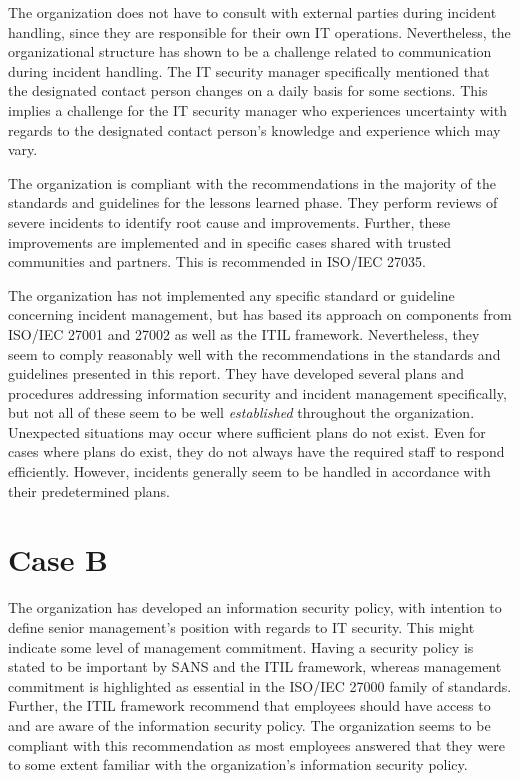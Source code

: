 The organization does not have to consult with external parties during incident handling, since they are responsible for their own IT operations. Nevertheless, the organizational structure has shown to be a challenge related to communication during incident handling. The IT security manager specifically mentioned that the designated contact person changes on a daily basis for some sections. This implies a challenge for the IT security manager who experiences uncertainty with regards to the designated contact person's knowledge and experience which may vary.

The organization is compliant with the recommendations in the majority of the standards and guidelines for the lessons learned phase. They perform reviews of severe incidents to identify root cause and improvements. Further, these improvements are implemented and in specific cases shared with trusted communities and partners. This is recommended in ISO/IEC 27035. 

The organization has not implemented any specific standard or guideline concerning incident management, but has based its approach on components from ISO/IEC 27001 and 27002 as well as the \ac{ITIL} framework. Nevertheless, they seem to comply reasonably well with the recommendations in the standards and guidelines presented in this report. They have developed several plans and procedures addressing information security and incident management specifically, but not all of these seem to be well \textit{established} throughout the organization. Unexpected situations may occur where sufficient plans do not exist. Even for cases where plans do exist, they do not always have the required staff to respond efficiently. However, incidents generally seem to be handled in accordance with their predetermined plans.


\section{Case B}
The organization has developed an information security policy, with intention to define senior management's position with regards to IT security. This might indicate some level of management commitment. Having a security policy is stated to be important by SANS and the ITIL framework, whereas management commitment is highlighted as essential in the ISO/IEC 27000 family of standards. Further, the ITIL framework recommend that employees should have access to and are aware of the information security policy. The organization seems to be compliant with this recommendation as most employees answered that they were to some extent familiar with the organization's information security policy. 

